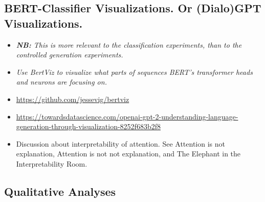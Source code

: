 

\subsection{BERT-Classifier Visualizations. Or (Dialo)GPT Visualizations.}

\begin{itemize}
    \item \textit{\textbf{NB:} This is more relevant to the classification experiments, than to the controlled generation experiments.}
    
    \item \textit{Use BertViz \citep{vig-2019-multiscale} to visualize what parts of sequences BERT's transformer heads and neurons are focusing on.}
    
    \item \url{https://github.com/jessevig/bertviz}
    
    \item \url{https://towardsdatascience.com/openai-gpt-2-understanding-language-generation-through-visualization-8252f683b2f8}
    
    \item Discussion about interpretability of attention. See Attention is not explanation, Attention is not not explanation, and The Elephant in the Interpretability Room.
\end{itemize}



\subsection{Qualitative Analyses}
\label{subsec:ctg_anal_qualitative}

